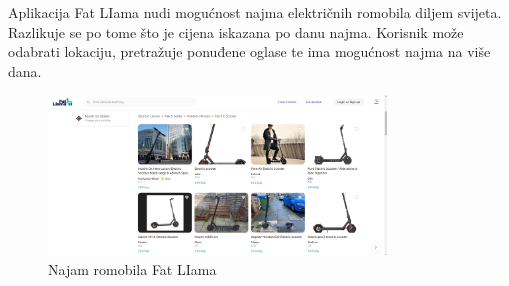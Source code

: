 		\indent Aplikacija Fat LIama nudi mogućnost najma električnih romobila diljem svijeta. Razlikuje se po tome što je cijena iskazana po danu najma. Korisnik može odabrati lokaciju, pretražuje ponuđene oglase te ima mogućnost najma na više dana.\\
		 
		 \begin{figure}[t]
		 	\centering
		 	\includegraphics[width=0.8\textwidth]{fat-liama.png}
		 	\caption{Najam romobila Fat LIama}
		 	\label{fig:your_label}
		 \end{figure}
		
		
		
		
	